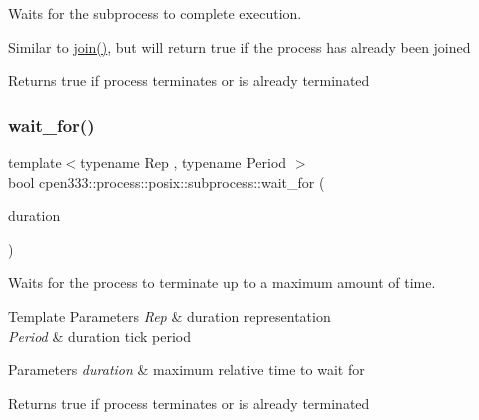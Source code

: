 Waits for the subprocess to complete execution. 

Similar to \hyperlink{classcpen333_1_1process_1_1posix_1_1subprocess_af711962e3b6649476bd8cbbd6c59ea8b}{join()}, but will return true if the process has already been joined

\begin{DoxyReturn}{Returns}
true if process terminates or is already terminated 
\end{DoxyReturn}
\mbox{\label{classcpen333_1_1process_1_1posix_1_1subprocess_a1543488d24eaf0f819e81f31d9d388cb}} 
\subsubsection{\texorpdfstring{wait\+\_\+for()}{wait\_for()}}
{\footnotesize\ttfamily template$<$typename Rep , typename Period $>$ \\
bool cpen333\+::process\+::posix\+::subprocess\+::wait\+\_\+for (\begin{DoxyParamCaption}\item[{const std\+::chrono\+::duration$<$ Rep, Period $>$ \&}]{duration }\end{DoxyParamCaption})\hspace{0.3cm}{\ttfamily [inline]}}



Waits for the process to terminate up to a maximum amount of time. 


\begin{DoxyTemplParams}{Template Parameters}
{\em Rep} & duration representation \\
\hline
{\em Period} & duration tick period \\
\hline
\end{DoxyTemplParams}

\begin{DoxyParams}{Parameters}
{\em duration} & maximum relative time to wait for \\
\hline
\end{DoxyParams}
\begin{DoxyReturn}{Returns}
true if process terminates or is already terminated 
\end{DoxyReturn}
\mbox{\label{classcpen333_1_1process_1_1posix_1_1subprocess_a10ea54174a30dd26c0d1ff289b88cd42}} 
